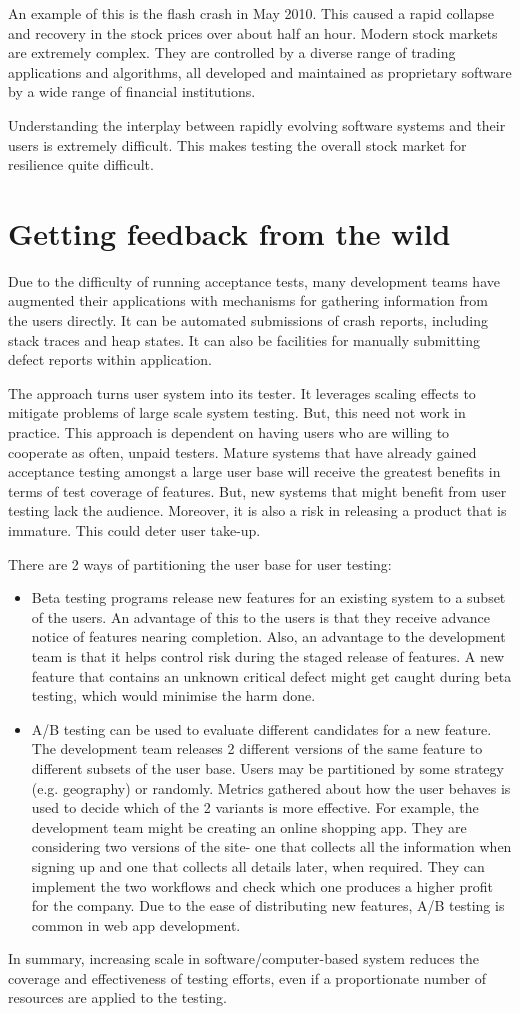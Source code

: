 \documentclass[a4paper, openany]{memoir}
\begin{document}
An example of this is the flash crash in May 2010. This caused a rapid collapse and recovery in the stock prices over about half an hour. Modern stock markets are extremely complex. They are controlled by a diverse range of trading applications and algorithms, all developed and maintained as proprietary software by a wide range of financial institutions.

Understanding the interplay between rapidly evolving software systems and their users is extremely difficult. This makes testing the overall stock market for resilience quite difficult.

\section{Getting feedback from the wild}
Due to the difficulty of running acceptance tests, many development teams have augmented their applications with mechanisms for gathering information from the users directly. It can be automated submissions of crash reports, including stack traces and heap states. It can also be facilities for manually submitting defect reports within application.

The approach turns user system into its tester. It leverages scaling effects to mitigate problems of large scale system testing. But, this need not work in practice. This approach is dependent on having users who are willing to cooperate as often, unpaid testers. Mature systems that have already gained acceptance testing amongst a large user base will receive the greatest benefits in terms of test coverage of features. But, new systems that might benefit from user testing lack the audience. Moreover, it is also a risk in releasing a product that is immature. This could deter user take-up.

There are 2 ways of partitioning the user base for user testing:
\begin{itemize}
    \item Beta testing programs release new features for an existing system to a subset of the users. An advantage of this to the users is that they receive advance notice of features nearing completion. Also, an advantage to the development team is that it helps control risk during the staged release of features. A new feature that contains an unknown critical defect might get caught during beta testing, which would minimise the harm done.
    \item A/B testing can be used to evaluate different candidates for a new feature. The development team releases 2 different versions of the same feature to different subsets of the user base. Users may be partitioned by some strategy (e.g. geography) or randomly. Metrics gathered about how the user behaves is used to decide which of the 2 variants is more effective. For example, the development team might be creating an online shopping app. They are considering two versions of the site- one that collects all the information when signing up and one that collects all details later, when required. They can implement the two workflows and check which one produces a higher profit for the company. Due to the ease of distributing new features, A/B testing is common in web app development.
\end{itemize}

In summary, increasing scale in software/computer-based system reduces the coverage and effectiveness of testing efforts, even if a proportionate number of resources are applied to the testing.
\end{document}
